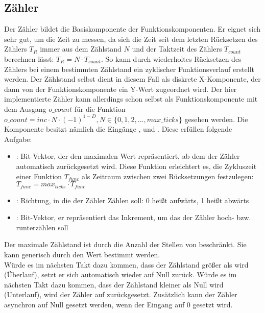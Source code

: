 \subsection{Zähler} \label{Comp:Arith:Count}
Der Zähler bildet die Basiskomponente der Funktionskomponenten. Er eignet sich sehr gut, um die Zeit zu messen, da sich die Zeit seit dem letzten Rücksetzen des Zählers $T_{R}$ immer aus dem Zählstand $N$ und der Taktzeit des Zählers $T_{count}$ berechnen lässt: $T_{R} = N \cdot T_{count}$. So kann durch wiederholtes Rücksetzen des Zählers bei einem bestimmten Zählstand ein zyklischer Funktionsverlauf erstellt werden.
Der Zählstand selbst dient in diesem Fall als diskrete X-Komponente, der dann von der Funktionskomponente ein Y-Wert zugeordnet wird.
Der hier implementierte Zähler kann allerdings schon selbst als Funktionskomponente mit dem Ausgang $o\_count$ für die Funktion $o\_count = inc \cdot N \cdot (-1) ^ {1 - D}, N \in \{0, 1, 2, \dots, max\_ticks\}$ gesehen werden.
Die Komponente besitzt nämlich die Eingänge ,  und . Diese erfüllen folgende Aufgabe:
\begin{itemize}
\item {}: Bit-Vektor, der den maximalen Wert repräsentiert, ab dem der Zähler automatisch zurückgesetzt wird.
Diese Funktion erleichtert es, die Zykluszeit einer Funktion $T_{func}$ als Zeitraum zwischen zwei Rücksetzungen festzulegen: $T_{func} = max_{ticks} \cdot T_{func}$
\item {}: Richtung, in die der Zähler Zählen soll: 0 heißt aufwärts, 1 heißt abwärts
  \item {}: Bit-Vektor, er repräsentiert das Inkrement, um das der Zähler hoch- bzw. runterzählen soll
\end{itemize}

Der maximale Zählstand ist durch die Anzahl der Stellen von  beschränkt. Sie kann generisch durch den Wert  bestimmt werden. \\
Würde es im nächsten Takt dazu kommen, dass der Zählstand größer als  wird (Überlauf), setzt er sich automatisch wieder auf Null zurück.
Würde es im nächsten Takt dazu kommen, dass der Zählstand kleiner als Null wird (Unterlauf), wird der Zähler auf  zurückgesetzt.
Zusätzlich kann der Zähler asynchron auf Null gesetzt werden, wenn der Eingang  auf 0 gesetzt wird.


